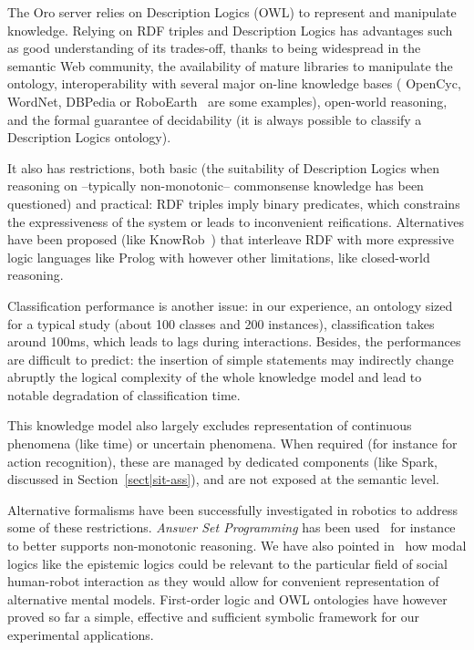 \documentclass[preprint,3p,times]{elsarticle}
\begin{document}
The {\sc Oro} server relies on Description Logics (OWL) to represent and
manipulate knowledge. Relying on RDF triples and Description Logics has advantages such as good
understanding of its trades-off, thanks to being widespread in the semantic Web
community, the availability of mature libraries to manipulate the ontology,
interoperability with several major on-line knowledge bases ({\sc
OpenCyc}, {\sc WordNet}, {\sc DBPedia} or {\sc RoboEarth}~\cite{Waibel2011} are
some examples), open-world reasoning, and the formal guarantee of decidability
(it is always possible to classify a Description Logics ontology).

It also has restrictions, both basic (the suitability of
Description Logics when reasoning on --typically non-monotonic-- commonsense
knowledge has been questioned) and practical: RDF triples imply binary
predicates, which constrains the expressiveness of the system or leads to
inconvenient reifications. Alternatives have been proposed (like {\sc
KnowRob}~\cite{Tenorth2009a}) that interleave RDF with more expressive logic languages
like {\sc Prolog} with however other limitations, like closed-world reasoning.

Classification performance is another issue: in our experience, an
ontology sized for a typical study (about 100 classes and 200 instances),
classification takes around 100ms, which leads to lags during
interactions.  Besides, the performances are difficult to predict: the insertion
of simple statements may indirectly change abruptly the logical
complexity of the whole knowledge model and lead to notable degradation of
classification time.

This knowledge model also largely excludes representation of continuous
phenomena (like time) or uncertain phenomena. When required (for instance for
action recognition), these are managed by dedicated components (like {\sc
Spark}, discussed in Section~\ref{sect|sit-ass}), and are not exposed at
the semantic level.

Alternative formalisms have been successfully investigated in robotics to
address some of these restrictions. \emph{Answer Set Programming} has been
used~\cite{Chen2010,Erdem2012} for instance to better supports non-monotonic
reasoning. We have also pointed in~\cite{lemaignan2015mutual} how modal logics like
the epistemic logics could be relevant to the particular field of social
human-robot interaction as they would allow for convenient representation of
alternative mental models. First-order logic and OWL ontologies have however
proved so far a simple, effective and sufficient symbolic framework for our
experimental applications. 
\end{document}
